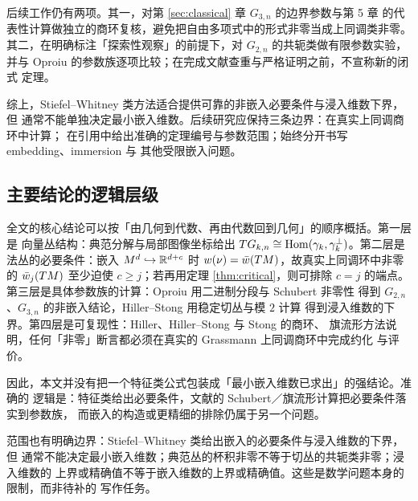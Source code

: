 后续工作仍有两项。其一，对第 \ref{sec:classical} 章 $G_{3,n}$ 的边界参数与第 5 章
的代表性计算做独立的商环复核，避免把自由多项式中的形式非零当成上同调类非零。
其二，在明确标注「探索性观察」的前提下，对 $G_{2,n}$ 的共轭类做有限参数实验，
并与 Oproiu 的参数族逐项比较；在完成文献查重与严格证明之前，不宣称新的闭式
定理。

综上，Stiefel--Whitney 类方法适合提供可靠的非嵌入必要条件与浸入维数下界，但
通常不能单独决定最小嵌入维数。后续研究应保持三条边界：在真实上同调商环中计算；
在引用中给出准确的定理编号与参数范围；始终分开书写 embedding、immersion 与
其他受限嵌入问题。

\subsection{主要结论的逻辑层级}

全文的核心结论可以按「由几何到代数、再由代数回到几何」的顺序概括。第一层是
向量丛结构：典范分解与局部图像坐标给出
$TG_{k,n}\cong\operatorname{Hom}(\gamma_k,\gamma^{\perp}_k)$。第二层是法丛的必要条件：嵌入
$M^{d}\hookrightarrow\mathbb{R}^{d+c}$ 时 $w(\nu)=\bar w(TM)$，故真实上同调环中非零的
$\bar w_j(TM)$ 至少迫使 $c\ge j$；若再用定理 \ref{thm:critical}，则可排除
$c=j$ 的端点。第三层是具体参数族的计算：Oproiu 用二进制分段与 Schubert 非零性
得到 $G_{2,n}$、$G_{3,n}$ 的非嵌入结论，Hiller--Stong 用稳定切丛与模 $2$ 计算
得到浸入维数的下界。第四层是可复现性：Hiller、Hiller--Stong 与 Stong 的商环、
旗流形方法说明，任何「非零」断言都必须在真实的 Grassmann 上同调商环中完成约化
与评价。

因此，本文并没有把一个特征类公式包装成「最小嵌入维数已求出」的强结论。准确的
逻辑是：特征类给出必要条件，文献的 Schubert／旗流形计算把必要条件落实到参数族，
而嵌入的构造或更精细的排除仍属于另一个问题。

范围也有明确边界：Stiefel--Whitney 类给出嵌入的必要条件与浸入维数的下界，但
通常不能决定最小嵌入维数；典范丛的杯积非零不等于切丛的共轭类非零；浸入维数的
上界或精确值不等于嵌入维数的上界或精确值。这些是数学问题本身的限制，而非待补的
写作任务。
